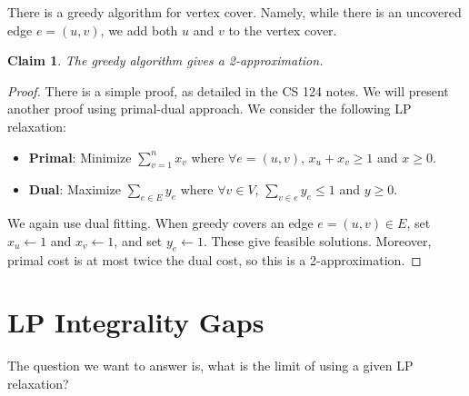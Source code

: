 \documentclass[11pt]{article}
\newtheorem{claim}[theorem]{Claim}
\theoremstyle{definition}
\theoremstyle{remark}
\begin{document}
There is a greedy algorithm for vertex cover. Namely, while there is an uncovered edge $e = (u, v)$,
we add both $u$ and $v$ to the vertex cover.

\begin{claim}
    The greedy algorithm gives a 2-approximation.
\end{claim}
\begin{proof}
    There is a simple proof, as detailed in the CS 124 notes.
    We will present another proof using primal-dual approach.
    We consider the following LP relaxation:
    \begin{itemize}
        \item \textbf{Primal}: Minimize $\sum_{v=1}^n x_v$ where $\forall e=(u, v)$, $x_u+x_v \geq 1$
            and $x \geq 0$.
        \item \textbf{Dual}: Maximize $\sum_{e\in E} y_e$ where $\forall v \in V$,
            $\sum_{v \in e} y_e \leq 1$ and $y \geq 0$.
    \end{itemize}
    We again use dual fitting.
    When greedy covers an edge $e=(u, v) \in E$, set $x_u  \leftarrow 1$
    and $x_v \leftarrow 1$, and set $y_e \leftarrow 1$.
    These give feasible solutions.
    Moreover, primal cost is at most twice the dual cost,
    so this is a 2-approximation.
\end{proof}

\section{LP Integrality Gaps}
The question we want to answer is, what is the limit of using a given LP relaxation?
\end{document}

